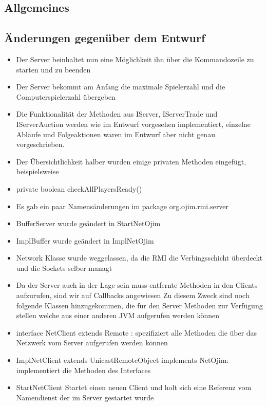 \documentclass[a4paper,10pt]{article}
\begin{document}
\subsection{Allgemeines}
\subsection {Änderungen gegenüber dem Entwurf}
\begin{itemize}
\item Der Server beinhaltet nun eine Möglichkeit ihn über die Kommandozeile zu starten und zu beenden
\item Der Server bekommt am Anfang die maximale Spielerzahl und die Computerspielerzahl übergeben
\item Die Funktionalität der Methoden aus IServer, IServerTrade und IServerAuction werden wie im Entwurf vorgesehen implementiert, einzelne Abläufe und Folgeaktionen waren im Entwurf aber nicht genau vorgeschrieben.
\item Der Übersichtlichkeit halber wurden einige privaten Methoden eingefügt, beispielsweise
\end{itemize}
\begin{itemize}
\item private boolean checkAllPlayersReady()
\item Es gab ein paar Namensänderungen im package org.ojim.rmi.server 
\end{itemize}
\begin{itemize}
\item BufferServer wurde geändert in StartNetOjim
\item ImplBuffer wurde geändert in ImplNetOjim
\end{itemize}
\begin{itemize}
\item Network Klasse wurde weggelassen, da die RMI die Verbingsschicht überdeckt und die Sockets selber managt
\item Da der Server auch in der Lage sein muss entfernte Methoden in den Clients aufzurufen, sind wir auf Callbacks angewiesen Zu diesem Zweck sind noch folgende Klassen hinzugekommen, die für den Server Methoden zur Verfügung stellen welche aus einer anderen JVM aufgerufen werden können
\end{itemize}
\begin{itemize}
\item interface NetClient extends Remote : spezifiziert alle Methoden die über das Netzwerk vom Server aufgerufen werden können 
\item ImplNetClient extends UnicastRemoteObject implements NetOjim: implementiert die Methoden des Interfaces
\item StartNetClient Startet einen neuen Client und holt sich eine Referenz vom Namendienst der im Server gestartet wurde
\end{itemize}
\end{document}
